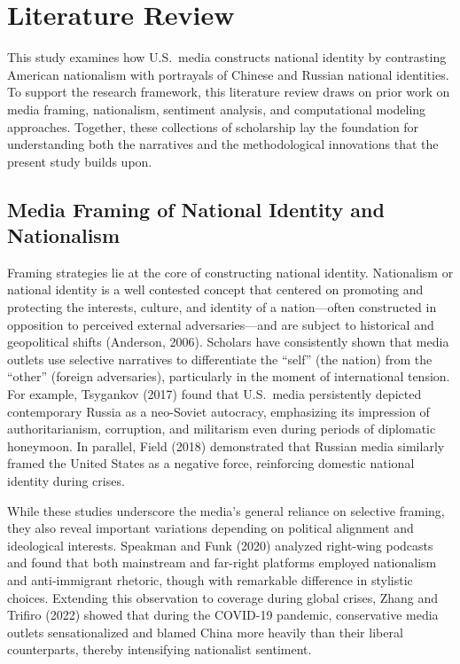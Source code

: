 \documentclass[12pt]{article}
\begin{document}
\clearpage
\section*{Literature Review}

This study examines how U.S.\ media constructs national identity by contrasting American nationalism with portrayals of Chinese and Russian national identities. To support the research framework, this literature review draws on prior work on media framing, nationalism, sentiment analysis, and computational modeling approaches. Together, these collections of scholarship lay the foundation for understanding both the narratives and the methodological innovations that the present study builds upon.

\subsection*{Media Framing of National Identity and Nationalism}

Framing strategies lie at the core of constructing national identity. Nationalism or national identity is a well contested concept that centered on promoting and protecting the interests, culture, and identity of a nation—often constructed in opposition to perceived external adversaries—and are subject to historical and geopolitical shifts (Anderson, 2006). Scholars have consistently shown that media outlets use selective narratives to differentiate the “self” (the nation) from the “other” (foreign adversaries), particularly in the moment of international tension. For example, Tsygankov (2017) found that U.S.\ media persistently depicted contemporary Russia as a neo-Soviet autocracy, emphasizing its impression of authoritarianism, corruption, and militarism even during periods of diplomatic honeymoon. In parallel, Field (2018) demonstrated that Russian media similarly framed the United States as a negative force, reinforcing domestic national identity during crises.

While these studies underscore the media’s general reliance on selective framing, they also reveal important variations depending on political alignment and ideological interests. Speakman and Funk (2020) analyzed right-wing podcasts and found that both mainstream and far-right platforms employed nationalism and anti-immigrant rhetoric, though with remarkable difference in stylistic choices. Extending this observation to coverage during global crises, Zhang and Trifiro (2022) showed that during the COVID-19 pandemic, conservative media outlets sensationalized and blamed China more heavily than their liberal counterparts, thereby intensifying nationalist sentiment.
\end{document}
